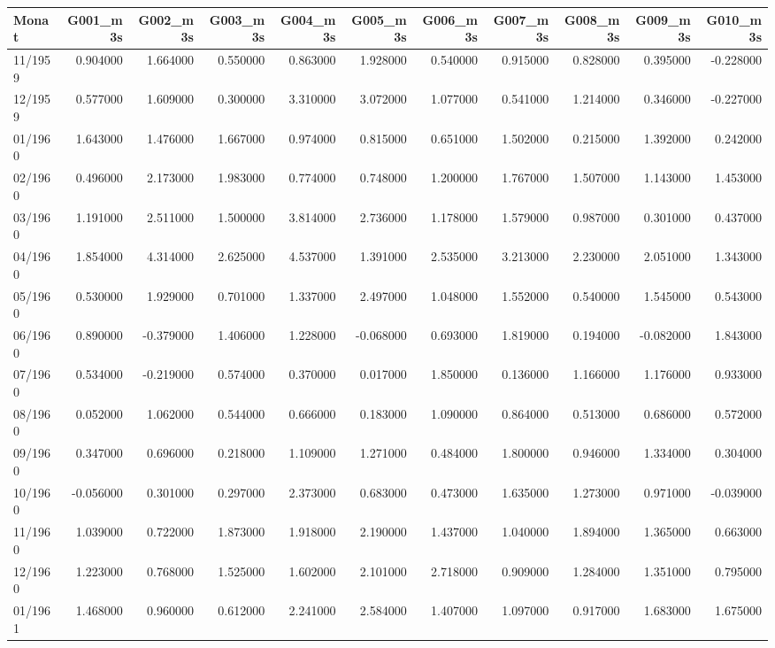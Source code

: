 \begin{tabular}{lrrrrrrrrrr}
\toprule
Monat & G001_m3s & G002_m3s & G003_m3s & G004_m3s & G005_m3s & G006_m3s & G007_m3s & G008_m3s & G009_m3s & G010_m3s \\
\midrule
11/1959 & 0.904000 & 1.664000 & 0.550000 & 0.863000 & 1.928000 & 0.540000 & 0.915000 & 0.828000 & 0.395000 & -0.228000 \\
12/1959 & 0.577000 & 1.609000 & 0.300000 & 3.310000 & 3.072000 & 1.077000 & 0.541000 & 1.214000 & 0.346000 & -0.227000 \\
01/1960 & 1.643000 & 1.476000 & 1.667000 & 0.974000 & 0.815000 & 0.651000 & 1.502000 & 0.215000 & 1.392000 & 0.242000 \\
02/1960 & 0.496000 & 2.173000 & 1.983000 & 0.774000 & 0.748000 & 1.200000 & 1.767000 & 1.507000 & 1.143000 & 1.453000 \\
03/1960 & 1.191000 & 2.511000 & 1.500000 & 3.814000 & 2.736000 & 1.178000 & 1.579000 & 0.987000 & 0.301000 & 0.437000 \\
04/1960 & 1.854000 & 4.314000 & 2.625000 & 4.537000 & 1.391000 & 2.535000 & 3.213000 & 2.230000 & 2.051000 & 1.343000 \\
05/1960 & 0.530000 & 1.929000 & 0.701000 & 1.337000 & 2.497000 & 1.048000 & 1.552000 & 0.540000 & 1.545000 & 0.543000 \\
06/1960 & 0.890000 & -0.379000 & 1.406000 & 1.228000 & -0.068000 & 0.693000 & 1.819000 & 0.194000 & -0.082000 & 1.843000 \\
07/1960 & 0.534000 & -0.219000 & 0.574000 & 0.370000 & 0.017000 & 1.850000 & 0.136000 & 1.166000 & 1.176000 & 0.933000 \\
08/1960 & 0.052000 & 1.062000 & 0.544000 & 0.666000 & 0.183000 & 1.090000 & 0.864000 & 0.513000 & 0.686000 & 0.572000 \\
09/1960 & 0.347000 & 0.696000 & 0.218000 & 1.109000 & 1.271000 & 0.484000 & 1.800000 & 0.946000 & 1.334000 & 0.304000 \\
10/1960 & -0.056000 & 0.301000 & 0.297000 & 2.373000 & 0.683000 & 0.473000 & 1.635000 & 1.273000 & 0.971000 & -0.039000 \\
11/1960 & 1.039000 & 0.722000 & 1.873000 & 1.918000 & 2.190000 & 1.437000 & 1.040000 & 1.894000 & 1.365000 & 0.663000 \\
12/1960 & 1.223000 & 0.768000 & 1.525000 & 1.602000 & 2.101000 & 2.718000 & 0.909000 & 1.284000 & 1.351000 & 0.795000 \\
01/1961 & 1.468000 & 0.960000 & 0.612000 & 2.241000 & 2.584000 & 1.407000 & 1.097000 & 0.917000 & 1.683000 & 1.675000 \\

\end{tabular}
